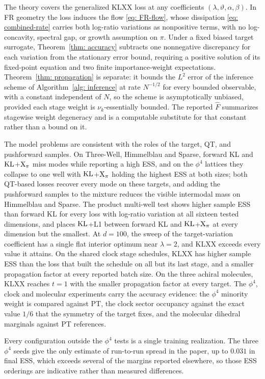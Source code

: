 \documentclass{article}
\begin{document}
The theory covers the generalized KLXX loss at any coefficients $(\lambda,\vartheta,\alpha,\beta)$. In FR geometry the loss induces the flow \eqref{eq: FR-flow}, whose dissipation \eqref{eq: combined-rate} carries both log-ratio variations as nonpositive terms, with no log-concavity, spectral gap, or growth assumption on $\pi$. Under a fixed biased target surrogate, Theorem~\ref{thm: accuracy} subtracts one nonnegative discrepancy for each variation from the stationary error bound, requiring a positive solution of its fixed-point equation and two finite importance-weight expectations. Theorem~\ref{thm: propagation} is separate: it bounds the $L^2$ error of the inference scheme of Algorithm~\ref{alg: inference} at rate $N^{-1/2}$ for every bounded observable, with a constant independent of $N$, so the scheme is asymptotically unbiased, provided each stage weight is $\nu_k$-essentially bounded. The reported $\hat F$ summarizes stagewise weight degeneracy and is a computable substitute for that constant rather than a bound on it.

The model problems are consistent with the roles of the target, QT, and pushforward samples. On Three-Well, Himmelblau and Sparse, forward KL and $\mathrm{KL}$+$\mathrm{X}_\pi$ miss modes while reporting a high ESS, and on the $\phi^4$ lattices they collapse to one well with $\mathrm{KL}$+$\mathrm{X}_\pi$ holding the highest ESS at both sizes; both QT-based losses recover every mode on these targets, and adding the pushforward samples to the mixture reduces the visible intermodal mass on Himmelblau and Sparse. The product multi-well test shows higher sample ESS than forward KL for every loss with log-ratio variation at all sixteen tested dimensions, and places $\mathrm{KL}$+L1 between forward KL and $\mathrm{KL}$+$\mathrm{X}_\pi$ at every dimension but the smallest. At $d=100$, the sweep of the target-variation coefficient has a single flat interior optimum near $\lambda=2$, and KLXX exceeds every value it attains. On the shared clock stage schedules, KLXX has higher sample ESS than the loss that built the schedule on all but its last stage, and a smaller propagation factor at every reported batch size. On the three achiral molecules, KLXX reaches $t=1$ with the smaller propagation factor at every target. The $\phi^4$, clock and molecular experiments carry the accuracy evidence: the $\phi^4$ minority weight is compared against PT, the clock sector occupancy against the exact value $1/6$ that the symmetry of the target fixes, and the molecular dihedral marginals against PT references.

Every configuration outside the $\phi^4$ tests is a single training realization. The three $\phi^4$ seeds give the only estimate of run-to-run spread in the paper, up to $0.031$ in final ESS, which exceeds several of the margins reported elsewhere, so those ESS orderings are indicative rather than measured differences.
\end{document}
